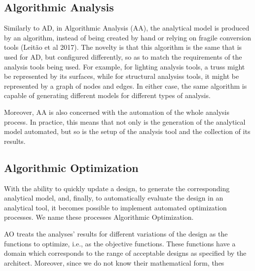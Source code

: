 \subsection{Algorithmic Analysis}
	Similarly to AD, in Algorithmic Analysis (AA), the analytical model is produced by an algorithm, instead of being created by hand or relying on fragile conversion tools (Leitão et al 2017). The novelty is that this algorithm is the same that is used for AD, but configured differently, so as to match the requirements of the analysis tools being used. For example, for lighting analysis tools, a truss might be represented by its surfaces, while for structural analysiss tools, it might be represented by a graph of nodes and edges. In either case, the same algorithm is capable of generating different models for different types of analysis.

	Moreover, AA is also concerned with the automation of the whole analysis process. In practice, this means that not only is the generation of the analytical model automated, but so is the setup of the analysis tool and the collection of its results.

\subsection{Algorithmic Optimization}
	With the ability to quickly update a design, to generate the corresponding analytical model, and, finally, to automatically evaluate the design in an analytical tool, it becomes possible to implement automated optimization processes. We name these processes Algorithmic Optimization.

	AO treats the analyses' results for different variations of the design as the functions to optimize, i.e., as the objective functions. These functions have a domain which corresponds to the range of acceptable designs as specified by the architect. Moreover, since we do not know their mathematical form, thes
	

